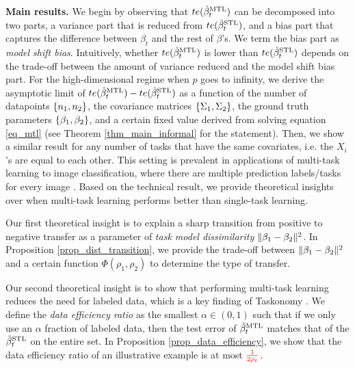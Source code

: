 

\textbf{Main results.}
	We begin by observing that $te(\hat{\beta}_t^{\text{MTL}})$ can be decomposed into two parts, a variance part that is reduced from $te(\hat{\beta}_t^{\text{STL}})$, and a bias part that captures the difference between $\beta_t$ and the rest of $\beta$'s.
	We term the bias part as \textit{model shift bias}.
	Intuitively, whether $te(\hat{\beta}_t^{\text{MTL}})$ is lower than $te(\hat{\beta}_t^{\text{STL}})$ depends on the trade-off between the amount of variance reduced and the model shift bias part.
	For the high-dimensional regime when $p$ goes to infinity, we derive the asymptotic limit of $te(\hat{\beta}_t^{\text{MTL}}) - te(\hat{\beta}_t^{\text{STL}})$ as a function of the number of datapoints $\{n_1, n_2\}$, the covariance matrices $\{\Sigma_1, \Sigma_2\}$, the ground truth parameters $\{\beta_1, \beta_2\}$, and a certain fixed value derived from solving equation \eqref{eq_mtl} (see Theorem \ref{thm_main_informal} for the statement).
	Then, we show a similar result for any number of tasks that have the same covariates, i.e. the $X_i$'s are equal to each other.
	This setting is prevalent in applications of multi-task learning to image classification, where there are multiple prediction labels/tasks for every image \cite{chexnet17,EA20}.
	Based on the technical result, we provide theoretical insights over when multi-task learning performs better than single-task learning.

Our first theoretical insight is to explain a sharp transition from positive to negative transfer as a parameter of \textit{task model dissimilarity} $\|\beta_1 - \beta_2\|^2$.
	In Proposition \ref{prop_dist_transition}, we provide the trade-off between $\|\beta_1 - \beta_2\|^2$ and a certain function $\Phi(\rho_1, \rho_2)$ to determine the type of transfer.

Our second theoretical insight is to show that performing multi-task learning reduces the need for labeled data, which is a key finding of Taskonomy \cite{ZSSGM18}.
	We define the \textit{data efficiency ratio} as the smallest $\alpha\in(0, 1)$ such that if we only use an $\alpha$ fraction of labeled data, then the test error of $\hat{\beta}_t^{\text{MTL}}$ matches that of the $\hat{\beta}_t^{\text{STL}}$ on the entire set.
	In Proposition \ref{prop_data_efficiency}, we show that the data efficiency ratio of an illustrative example is at most $\textcolor{red}{\frac {1}{2\rho_t}}$.

